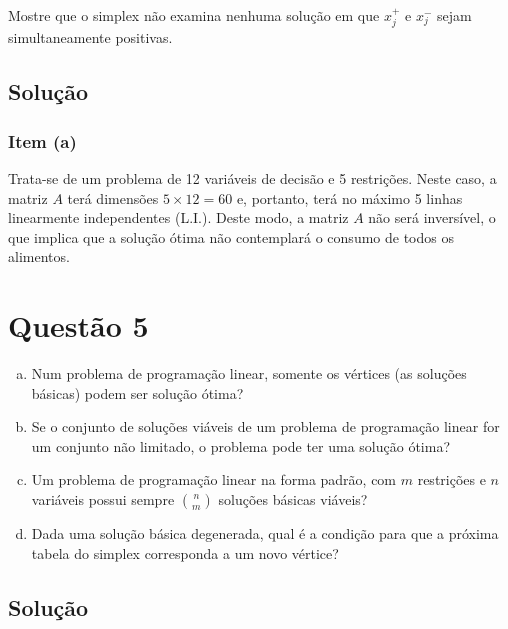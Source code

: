 \documentclass{article}
\begin{document}
Mostre que o simplex não examina nenhuma solução em que $x_{j}^{+}$ e $x_{j}^{-}$ sejam simultaneamente positivas.

\subsection{Solução}

\subsubsection{Item (a)}

Trata-se de um problema de 12 variáveis de decisão e 5 restrições.
Neste caso, a matriz $A$ terá dimensões $5 \times 12 = 60$ e, portanto, terá no máximo 5 linhas linearmente independentes (L.I.).
Deste modo, a matriz $A$ não será inversível, o que implica que a solução ótima não contemplará o consumo de todos os alimentos.



\section{Questão 5}

\begin{enumerate}[(a)]
    \item Num problema de programação linear, somente os vértices (as soluções básicas) podem ser solução ótima?
    \item Se o conjunto de soluções viáveis de um problema de programação linear for um conjunto não limitado, o problema pode ter uma solução ótima?
    \item Um problema de programação linear na forma padrão, com $m$ restrições e $n$ variáveis possui sempre $\binom{n}{m}$ soluções básicas viáveis?
    \item Dada uma solução básica degenerada, qual é a condição para que a próxima tabela do simplex corresponda a um novo vértice?
\end{enumerate}

\subsection{Solução}
\end{document}
